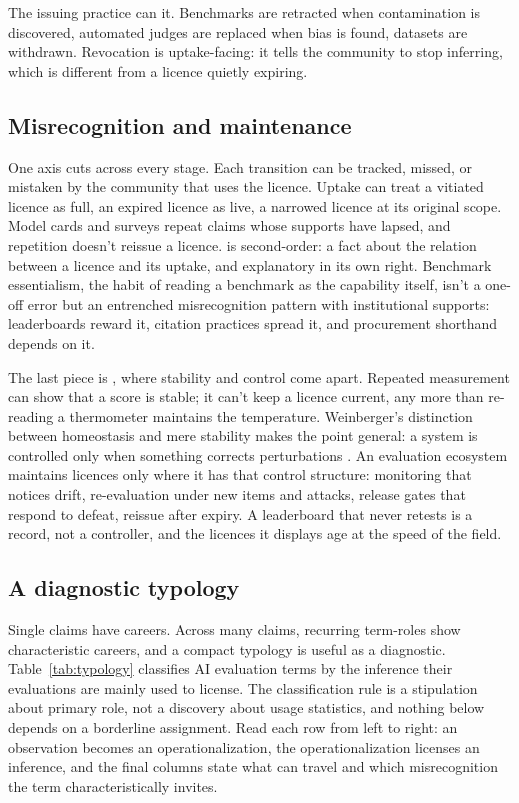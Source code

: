 \documentclass[12pt]{article}
\begin{document}
The issuing practice can  it. Benchmarks are retracted when
contamination is discovered, automated judges are replaced when bias is found,
datasets are withdrawn. Revocation is uptake-facing: it tells the community to
stop inferring, which is different from a licence quietly expiring.

\subsection{Misrecognition and maintenance}

One axis cuts across every stage. Each transition can be tracked, missed, or
mistaken by the community that uses the licence. Uptake can treat a vitiated
licence as full, an expired licence as live, a narrowed licence at its original
scope. Model cards and surveys repeat claims whose supports have lapsed, and
repetition doesn't reissue a licence.  is second-order: a
fact about the relation between a licence and its uptake, and explanatory in
its own right. Benchmark essentialism, the habit of reading a benchmark as the
capability itself, isn't a one-off error but an entrenched misrecognition
pattern with institutional supports: leaderboards reward it, citation practices
spread it, and procurement shorthand depends on it.

The last piece is , where stability and control come apart.
Repeated measurement can show that a score is stable; it can't keep a licence
current, any more than re-reading a thermometer maintains the temperature.
Weinberger's distinction between homeostasis and mere stability makes the point
general: a system is controlled only when something corrects perturbations
\citep{weinberger2026HomeostasisCausalControl}. An evaluation ecosystem
maintains licences only where it has that control structure: monitoring that
notices drift, re-evaluation under new items and attacks, release gates that
respond to defeat, reissue after expiry. A leaderboard that never retests is a
record, not a controller, and the licences it displays age at the speed of the
field.

\subsection{A diagnostic typology}\label{sec:typology}

Single claims have careers. Across many claims, recurring term-roles show
characteristic careers, and a compact typology is useful as a diagnostic.
Table~\ref{tab:typology} classifies AI evaluation terms by the inference their
evaluations are mainly used to license. The classification rule is a
stipulation about primary role, not a discovery about usage statistics, and
nothing below depends on a borderline assignment. Read each row from left to
right: an observation becomes an operationalization, the operationalization
licenses an inference, and the final columns state what can travel and which
misrecognition the term characteristically invites.
\end{document}
